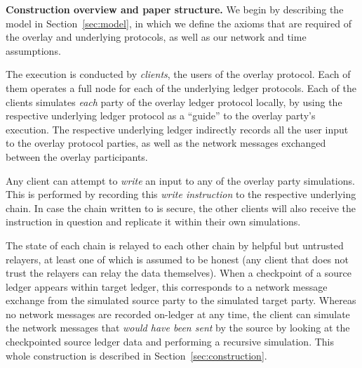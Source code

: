 \noindent
\textbf{Construction overview and paper structure.}
We begin by describing the model in Section~\ref{sec:model}, in which
we define the axioms that are required of the overlay and underlying protocols,
as well as our network and time assumptions.

The execution is conducted by \emph{\rollerblade clients},
the users of the overlay protocol.
Each of them operates a full node for each of the underlying ledger protocols.
Each of the \rollerblade clients simulates \emph{each} party of the overlay
ledger protocol locally, by using the respective underlying ledger protocol
as a ``guide'' to the overlay party's execution.
The respective underlying ledger indirectly records all the
user input to the overlay protocol parties, as well as the network
messages exchanged between the overlay participants.

Any \rollerblade client can attempt to \emph{write} an input to any
of the overlay party simulations. This is performed by recording this
\emph{write instruction} to the respective underlying chain. In case
the chain written to is secure, the other \rollerblade clients will
also receive the instruction in question and replicate it within their
own simulations.

The
state of each chain is relayed to each other chain by helpful but
untrusted relayers, at least one of which is assumed to be honest
(any \rollerblade client that does not trust the relayers can relay
the data themselves). When a checkpoint of a source ledger
appears within target ledger, this corresponds to a network message
exchange from the simulated source party to the simulated target party.
Whereas no network messages are recorded on-ledger at any time,
the \rollerblade client can simulate the network messages that
\emph{would have been sent} by the source by looking at the checkpointed
source ledger data and performing a recursive simulation.
This whole construction is described in Section~\ref{sec:construction}.

